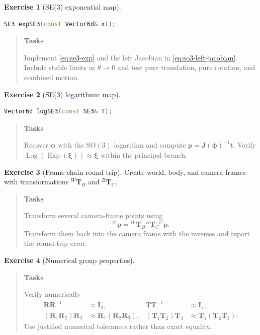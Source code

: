 \documentclass[10pt,a4paper]{article}
\numberwithin{equation}{section}
\newcommand{\SOthree}{\mathrm{SO}(3)}
\newcommand{\Exp}{\operatorname{Exp}}
\newcommand{\Log}{\operatorname{Log}}
\newcommand{\vect}[1]{\boldsymbol{#1}}
\theoremstyle{definition}
\theoremstyle{exercisestyle}
\newtheorem{exercise}{Exercise}[section]
\newenvironment{tasks}
    {\par\begin{quote}\small\textbf{Tasks}\par\smallskip}
    {\end{quote}}
\begin{document}
\begin{exercise}[SE(3) exponential map]
\begin{lstlisting}[language=C++]
SE3 expSE3(const Vector6d& xi);
\end{lstlisting}
\begin{tasks}
Implement \eqref{eq:se3-exp} and the left Jacobian in
\eqref{eq:so3-left-jacobian}. Include stable limits as
$\theta\rightarrow0$ and test pure translation, pure rotation, and combined
motion.
\end{tasks}
\end{exercise}

\begin{exercise}[SE(3) logarithmic map]
\begin{lstlisting}[language=C++]
Vector6d logSE3(const SE3& T);
\end{lstlisting}
\begin{tasks}
Recover $\vect{\phi}$ with the $\SOthree$ logarithm and compute
$\vect{\rho}=\mathbf{J}(\vect{\phi})^{-1}\mathbf{t}$. Verify
$\Log(\Exp(\vect{\xi}))\approx\vect{\xi}$ within the principal branch.
\end{tasks}
\end{exercise}

\begin{exercise}[Frame-chain round trip]
Create world, body, and camera frames with transformations
${}^W\mathbf{T}_B$ and ${}^B\mathbf{T}_C$.
\begin{tasks}
Transform several camera-frame points using
\[
    {}^W\mathbf{p}={}^W\mathbf{T}_B{}^B\mathbf{T}_C{}^C\mathbf{p}.
\]
Transform them back into the camera frame with the inverses and report the
round-trip error.
\end{tasks}
\end{exercise}

\begin{exercise}[Numerical group properties]
\begin{tasks}
Verify numerically
\begin{align*}
    \mathbf{R}\mathbf{R}^{-1}&\approx\mathbf{I}_3,
    &\mathbf{T}\mathbf{T}^{-1}&\approx\mathbf{I}_4,\\
    (\mathbf{R}_1\mathbf{R}_2)\mathbf{R}_3
        &\approx\mathbf{R}_1(\mathbf{R}_2\mathbf{R}_3),
    &(\mathbf{T}_1\mathbf{T}_2)\mathbf{T}_3
        &\approx\mathbf{T}_1(\mathbf{T}_2\mathbf{T}_3).
\end{align*}
Use justified numerical tolerances rather than exact equality.
\end{tasks}
\end{exercise}
\end{document}
